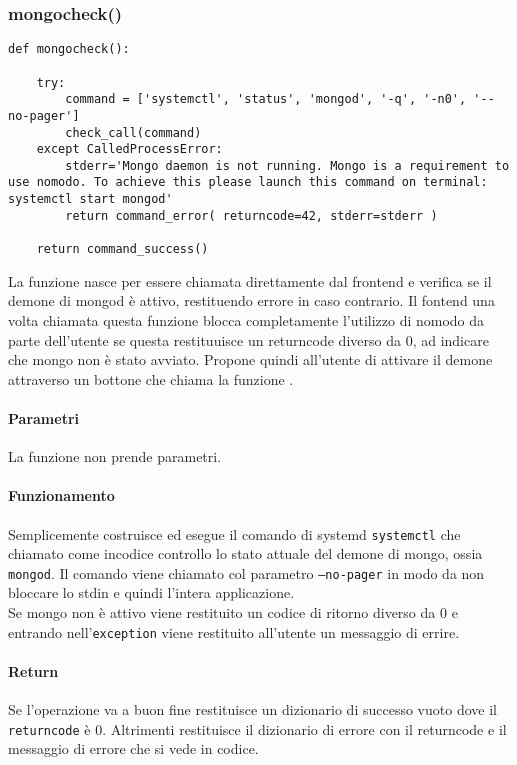 \documentclass[11pt]{article}
\begin{document}
\subsubsection{mongocheck()}\label{mongocheck}
\begin{lstlisting}
def mongocheck():

    try:
        command = ['systemctl', 'status', 'mongod', '-q', '-n0', '--no-pager']
        check_call(command)
    except CalledProcessError:
        stderr='Mongo daemon is not running. Mongo is a requirement to use nomodo. To achieve this please launch this command on terminal: systemctl start mongod'
        return command_error( returncode=42, stderr=stderr )

    return command_success()
\end{lstlisting}
La funzione nasce per essere chiamata direttamente dal frontend e verifica se il demone di mongod è attivo, restituendo errore in caso contrario.
Il fontend una volta chiamata questa funzione blocca completamente l'utilizzo di nomodo da parte dell'utente se questa restituuisce un
returncode diverso da 0, ad indicare che mongo non è stato avviato. Propone quindi all'utente di attivare il demone attraverso un bottone
che chiama la funzione .
\paragraph{Parametri}
La funzione non prende parametri.
\paragraph{Funzionamento}
Semplicemente costruisce ed esegue il comando di systemd \texttt{systemctl} che chiamato come incodice controllo lo stato attuale del demone
di mongo, ossia \texttt{mongod}. Il comando viene chiamato col parametro \texttt{--no-pager} in modo da non bloccare lo stdin e quindi
l'intera applicazione.\\
Se mongo non è attivo viene restituito un codice di ritorno diverso da 0 e entrando nell'\texttt{exception} viene restituito all'utente un
messaggio di errire.
\paragraph{Return}
Se l'operazione va a buon fine restituisce un dizionario di successo vuoto dove il \texttt{returncode} è 0. Altrimenti restituisce il dizionario
di errore con il returncode e il messaggio di errore che si vede in codice.
\end{document}
